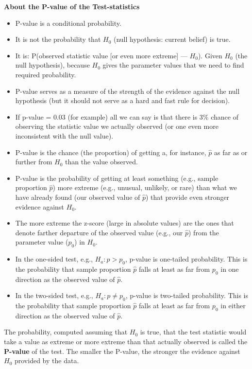 \begin{nt}
\textbf{About the P-value of the Test-statistics}

\begin{itemize}
  \item P-value is a conditional probability.
  \item It is not the probability that $H_0$ (null hypothesis: current belief) is true.
  \item It is: P(observed statistic value [or even more extreme] — $H_0$). Given $H_0$ (the null hypothesis), because $H_0$ gives the parameter values that we need to find required probability.
  \item P-value serves as a measure of the strength of the evidence against the null hypothesis (but it should not serve as a hard and fast rule for decision).
  \item If p-value = 0.03 (for example) all we can say is that there is 3\% chance of observing the statistic value we actually observed (or one even more inconsistent with the null value).
  \item P-value is the chance (the proportion) of getting a, for instance, $\hat{p}$ as far as or further from $H_0$ than the value observed.
  \item P-value is the probability of getting at least something (e.g., sample proportion $\hat{p}$) more extreme (e.g., unusual, unlikely, or rare) than what we have already found (our observed value of $\hat{p}$) that provide even stronger evidence against $H_0$.
  \item The more extreme the z-score (large in absolute values) are the ones that denote farther departure of the observed value (e.g., our $\hat{p}$) from the parameter value ($p_0$) in $H_0$.
  \item In the one-sided test, e.g., $H_a : p > p_0$, p-value is one-tailed probability. This is the probability that sample proportion $\hat{p}$ falls at least as far from $p_0$ in one direction as the observed value of $\hat{p}$.
  \item In the two-sided test, e.g., $H_a : p \ne p_0$, p-value is two-tailed probability. This is the probability that sample proportion $\hat{p}$ falls at least as far from $p_0$ in either direction as the observed value of $\hat{p}$.
\end{itemize}
\end{nt}
The probability, computed assuming that $H_0$ is true, that the test statistic would take a value as extreme or more extreme than that actually observed is called the \textbf{P-value} of the test. The smaller the P-value, the stronger the evidence against $H_0$ provided by the data.

